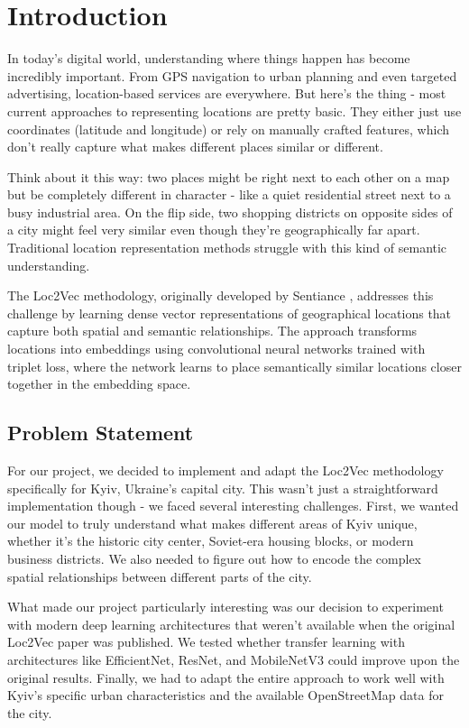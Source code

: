 \section{Introduction}

In today's digital world, understanding where things happen has become incredibly important. From GPS navigation to urban planning and even targeted advertising, location-based services are everywhere. But here's the thing - most current approaches to representing locations are pretty basic. They either just use coordinates (latitude and longitude) or rely on manually crafted features, which don't really capture what makes different places similar or different.

Think about it this way: two places might be right next to each other on a map but be completely different in character - like a quiet residential street next to a busy industrial area. On the flip side, two shopping districts on opposite sides of a city might feel very similar even though they're geographically far apart. Traditional location representation methods struggle with this kind of semantic understanding.

The Loc2Vec methodology, originally developed by Sentiance \cite{sentiance2018loc2vec}, addresses this challenge by learning dense vector representations of geographical locations that capture both spatial and semantic relationships. The approach transforms locations into embeddings using convolutional neural networks trained with triplet loss, where the network learns to place semantically similar locations closer together in the embedding space.

\subsection{Problem Statement}

For our project, we decided to implement and adapt the Loc2Vec methodology specifically for Kyiv, Ukraine's capital city. This wasn't just a straightforward implementation though - we faced several interesting challenges. First, we wanted our model to truly understand what makes different areas of Kyiv unique, whether it's the historic city center, Soviet-era housing blocks, or modern business districts. We also needed to figure out how to encode the complex spatial relationships between different parts of the city.

What made our project particularly interesting was our decision to experiment with modern deep learning architectures that weren't available when the original Loc2Vec paper was published. We tested whether transfer learning with architectures like EfficientNet, ResNet, and MobileNetV3 could improve upon the original results. Finally, we had to adapt the entire approach to work well with Kyiv's specific urban characteristics and the available OpenStreetMap data for the city.

